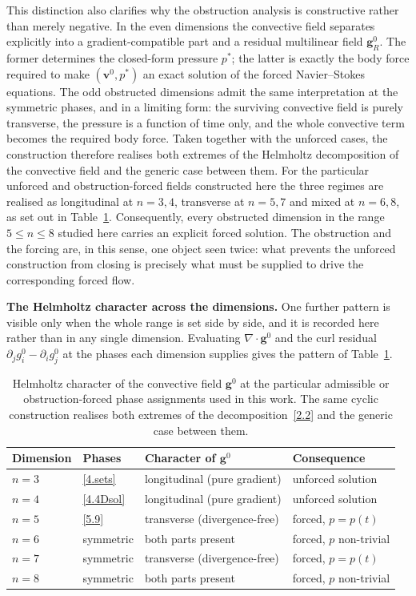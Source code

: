 \documentclass[11pt]{jfm}
\let\le=\leqslant  \let\leq=\leqslant
\numberwithin{equation}{section}
\begin{document}
This distinction also clarifies why the obstruction analysis is constructive rather than
merely negative. In the even dimensions the convective field separates explicitly into a
gradient-compatible part and a residual multilinear field
$\boldsymbol{g}^{0}_{R}$. The former determines the closed-form pressure $p^{*}$; the latter
is exactly the body force required to make $(\boldsymbol{v}^{0},p^{*})$ an exact solution of
the forced Navier--Stokes equations. The odd obstructed dimensions admit the same
interpretation at the symmetric phases, and in a limiting form: the surviving convective field is
purely transverse, the pressure is a function of time only, and the whole convective term becomes
the required body force. Taken together with the unforced cases, the construction therefore
realises both extremes of the Helmholtz decomposition of the convective field and the generic case
between them. For the particular unforced and obstruction-forced fields constructed here the three
regimes are realised as longitudinal at $n=3,4$, transverse at $n=5,7$ and mixed at $n=6,8$, as set
out in Table~\ref{tab:helmholtz}. Consequently, every obstructed
dimension in the range $5\le n\le8$ studied here carries an explicit forced solution. The obstruction and the forcing are, in this sense, one
object seen twice: what prevents the unforced construction from closing is precisely what
must be supplied to drive the corresponding forced flow.

\medskip
\noindent\textbf{The Helmholtz character across the dimensions.} One further pattern is visible
only when the whole range is set side by side, and it is recorded here rather than in any single
dimension. Evaluating
$\nabla\cdot\boldsymbol{g}^0$ and the curl residual $\partial_jg_i^0-\partial_ig_j^0$ at the phases
each dimension supplies gives the pattern of Table~\ref{tab:helmholtz}.

\begin{table}
\centering
\begin{tabular}{llll}
\hline
Dimension & Phases & Character of $\boldsymbol{g}^0$ & Consequence\\
\hline
$n=3$ & \eqref{4.sets} & longitudinal (pure gradient) & unforced solution\\
$n=4$ & \eqref{4.4Dsol} & longitudinal (pure gradient) & unforced solution\\
$n=5$ & \eqref{5.9} & transverse (divergence-free) & forced, $p=p(t)$\\
$n=6$ & symmetric & both parts present & forced, $p$ non-trivial\\
$n=7$ & symmetric & transverse (divergence-free) & forced, $p=p(t)$\\
$n=8$ & symmetric & both parts present & forced, $p$ non-trivial\\
\hline
\end{tabular}
\caption{Helmholtz character of the convective field $\boldsymbol{g}^0$ at the particular
admissible or obstruction-forced phase assignments used in this work. The same cyclic construction
realises both extremes of the decomposition~\eqref{2.2} and the generic case between them.}
\label{tab:helmholtz}
\end{table}
\end{document}
